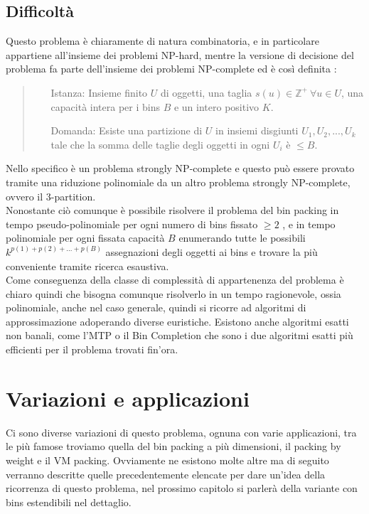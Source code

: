 \subsection{Difficoltà}
Questo problema è chiaramente di natura combinatoria, e in particolare appartiene all'insieme dei problemi NP-hard, mentre
la versione di decisione del problema fa parte dell'insieme dei problemi NP-complete ed è così definita \cite{CaI_NP}:
\begin{quote}
	\begin{itemize}
		\item[Istanza:] Insieme finito $ U $ di oggetti, una taglia $ s(u) \in \mathbb{Z}^+ \: \forall u \in U $, una capacità intera
						per i bins $ B $ e un intero positivo $ K $.
		\item[Domanda:] Esiste una partizione di $ U $ in insiemi disgiunti $ U_1, U_2, ..., U_k $ tale che la somma delle taglie degli
						oggetti in ogni $ U_i $ è $ \leq B $.
	\end{itemize}
\end{quote}
Nello specifico è un problema strongly NP-complete e questo può essere provato tramite una riduzione polinomiale da un altro
problema strongly NP-complete, ovvero il 3-partition. \\
Nonostante ciò comunque è possibile risolvere il problema del bin packing in tempo pseudo-polinomiale per ogni numero di
bins fissato $ \geq 2 $ \cite{BinPackingFixedSize}, e in tempo polinomiale per
ogni fissata capacità $ B $ enumerando tutte le possibili $ k^{p(1) + p(2) + ... + p(B)} $ assegnazioni degli oggetti ai
bins e trovare la più conveniente tramite ricerca esaustiva. \\
Come conseguenza della classe di complessità di appartenenza del problema è chiaro quindi che bisogna comunque risolverlo
in un tempo ragionevole, ossia polinomiale, anche nel caso generale, quindi si ricorre ad algoritmi
di approssimazione adoperando diverse euristiche.
Esistono anche algoritmi esatti non banali, come l'MTP \cite{MTP} o il Bin Completion \cite{BinCompletion} che sono i due
algoritmi esatti più efficienti per il problema trovati fin'ora.


\section{Variazioni e applicazioni}
Ci sono diverse variazioni di questo problema, ognuna con varie applicazioni, tra le più famose troviamo quella
del bin packing a più dimensioni, il packing by weight e il VM packing. Ovviamente ne esistono molte altre ma di seguito 
verranno descritte quelle precedentemente elencate per dare un'idea della ricorrenza di questo problema, nel prossimo 
capitolo si parlerà della variante con bins estendibili nel dettaglio.

